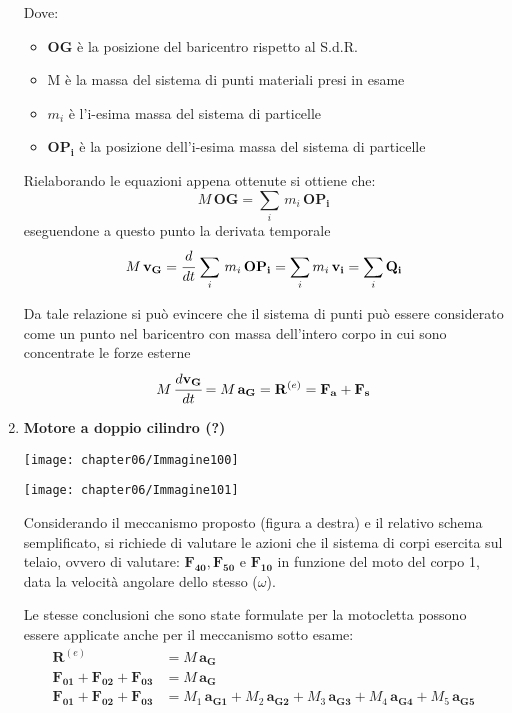 \begin{enumerate}
		Dove:
		\begin{itemize}
		\item $\mathbf{OG}$ è la posizione del baricentro rispetto al S.d.R.
		\item M è la massa del sistema di punti materiali presi in esame
		\item $m_i$ è l'i-esima massa del sistema di particelle
		\item $\mathbf{OP_i}$ è la posizione dell'i-esima massa del sistema di particelle
		\end{itemize}
		
		Rielaborando le equazioni appena ottenute si ottiene che:
		\[
		M\,\mathbf{OG} = \sum_i\,m_i\,\mathbf{OP_i}
		\]
		eseguendone a questo punto la derivata temporale
		\[
		M\,\mathbf{v_G} = \cfrac{d}{dt}\,\sum_i\,m_i\,\mathbf{OP_i} = \sum_i m_i\,\mathbf{v_i} = \sum_i \mathbf{Q_i}
		\]
		
		Da tale relazione si può evincere che il sistema di punti può essere considerato come un punto nel baricentro con massa dell'intero corpo in cui sono concentrate le forze esterne
		\begin{gather*}
		M\,\cfrac{d\mathbf{v_G}}{dt} = M\,\mathbf{a_G} = \mathbf{R}^{(e)} = \mathbf{F_a} + \mathbf{F_s}
		\end{gather*}
		
		\item \textbf{Motore a doppio cilindro (?)}

		\begin{minipage}{.5\textwidth}
		\centering
		\texttt{[image: chapter06/Immagine100]}
		\end{minipage}
		\hfill
		\begin{minipage}{.5\textwidth}
		\centering
		\texttt{[image: chapter06/Immagine101]}
		\end{minipage}
		
		Considerando il meccanismo proposto (figura a destra) e il relativo schema semplificato, si richiede di valutare le azioni che il sistema di corpi esercita sul telaio, ovvero di valutare: $\mathbf{F_{40}}, \mathbf{F_{50}}$ e $\mathbf{F_{10}}$ in funzione del moto del corpo 1, data la velocità angolare dello stesso ($\omega$).
		
		Le stesse conclusioni che sono state formulate per la motocletta possono essere applicate anche per il meccanismo sotto esame:
		\begin{align*}
			\mathbf{R}^{(e)} &= M\,\mathbf{a_G}\\
			\mathbf{F_{01}} + \mathbf{F_{02}} + \mathbf{F_{03}} &= M\,\mathbf{a_G}\\  	
			\mathbf{F_{01}} + \mathbf{F_{02}} + \mathbf{F_{03}} &= M_1\,\mathbf{a_{G1}} + M_2\,\mathbf{a_{G2}}+ M_3\,\mathbf{a_{G3}}+ M_4\,\mathbf{a_{G4}} + M_5\,\mathbf{a_{G5}}
 		\end{align*}
 		

\end{enumerate}
